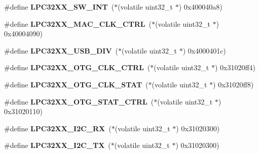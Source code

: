 \begin{DoxyCompactItemize}
\item 
\mbox{\label{group__lpc32xx__reg_gafe741dca9999d0ef1dd5e53b0ada09c2}} 
\#define {\bfseries L\+P\+C32\+X\+X\+\_\+\+S\+W\+\_\+\+I\+NT}~($\ast$(volatile uint32\+\_\+t $\ast$) 0x400040a8)
\item 
\mbox{\label{group__lpc32xx__reg_ga175085774e7eb581d396b52d9440859b}} 
\#define {\bfseries L\+P\+C32\+X\+X\+\_\+\+M\+A\+C\+\_\+\+C\+L\+K\+\_\+\+C\+T\+RL}~($\ast$(volatile uint32\+\_\+t $\ast$) 0x40004090)
\item 
\mbox{\label{group__lpc32xx__reg_ga84f50095d47c04611dee2e5a74e127d1}} 
\#define {\bfseries L\+P\+C32\+X\+X\+\_\+\+U\+S\+B\+\_\+\+D\+IV}~($\ast$(volatile uint32\+\_\+t $\ast$) 0x4000401c)
\item 
\mbox{\label{group__lpc32xx__reg_gaa74a699664e8aba4863925101442f352}} 
\#define {\bfseries L\+P\+C32\+X\+X\+\_\+\+O\+T\+G\+\_\+\+C\+L\+K\+\_\+\+C\+T\+RL}~($\ast$(volatile uint32\+\_\+t $\ast$) 0x31020ff4)
\item 
\mbox{\label{group__lpc32xx__reg_ga31900dd18efd23cb2c4c8cb06356b718}} 
\#define {\bfseries L\+P\+C32\+X\+X\+\_\+\+O\+T\+G\+\_\+\+C\+L\+K\+\_\+\+S\+T\+AT}~($\ast$(volatile uint32\+\_\+t $\ast$) 0x31020ff8)
\item 
\mbox{\label{group__lpc32xx__reg_ga9734ae30ba32d08ff46ff39d890f35ab}} 
\#define {\bfseries L\+P\+C32\+X\+X\+\_\+\+O\+T\+G\+\_\+\+S\+T\+A\+T\+\_\+\+C\+T\+RL}~($\ast$(volatile uint32\+\_\+t $\ast$) 0x31020110)
\item 
\mbox{\label{group__lpc32xx__reg_gaffff2ab20b452a23c533935db106d17c}} 
\#define {\bfseries L\+P\+C32\+X\+X\+\_\+\+I2\+C\+\_\+\+RX}~($\ast$(volatile uint32\+\_\+t $\ast$) 0x31020300)
\item 
\mbox{\label{group__lpc32xx__reg_ga02fb073423090116d0d01721d0810663}} 
\#define {\bfseries L\+P\+C32\+X\+X\+\_\+\+I2\+C\+\_\+\+TX}~($\ast$(volatile uint32\+\_\+t $\ast$) 0x31020300)
\item 
\mbox{\label{group__lpc32xx__reg_ga2b165845b21cb8341bd81cdd378acb17}} 

\end{DoxyCompactItemize}
